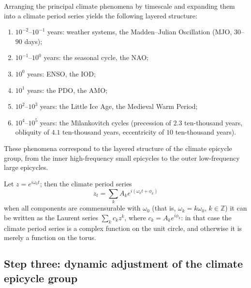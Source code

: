 \begin{example}\label{ex:climate_period_spectrum_series}
Arranging the principal climate phenomena by timescale and expanding them into a climate period series yields the following layered structure:
\begin{enumerate}[label=(\roman*)]
    \item $10^{-2}$--$10^{-1}$ years: weather systems, the Madden--Julian Oscillation (MJO, $30$--$90$ days);
    \item $10^{-1}$--$10^0$ years: the seasonal cycle, the NAO;
    \item $10^0$ years: ENSO, the IOD;
    \item $10^1$ years: the PDO, the AMO;
    \item $10^2$--$10^3$ years: the Little Ice Age, the Medieval Warm Period;
    \item $10^4$--$10^5$ years: the Milankovitch cycles (precession of $2.3$ ten-thousand years, obliquity of $4.1$ ten-thousand years, eccentricity of $10$ ten-thousand years).
\end{enumerate}
These phenomena correspond to the layered structure of the climate epicycle group, from the inner high-frequency small epicycles to the outer low-frequency large epicycles.
\end{example}

\begin{remark}\label{rem:climate_series_complex}
Let $z=e^{i\omega_0t}$; then the climate period series
\[
z_t=\sum_k A_k e^{i(\omega_k t+\phi_k)}
\]
when all components are commensurable with $\omega_0$ (that is, $\omega_k=k\omega_0$, $k\in\mathbb Z$) it can be written as the Laurent series $\sum_k c_k z^k$, where $c_k=A_k e^{i\phi_k}$: in that case the climate period series is a complex function on the unit circle, and otherwise it is merely a function on the torus.
\end{remark}

\subsection{Step three: dynamic adjustment of the climate epicycle group}

